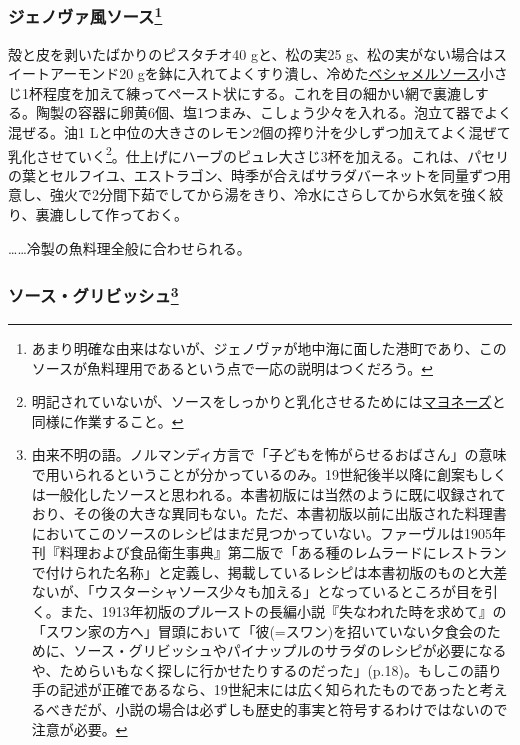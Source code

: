 \begin{recette}
\hypertarget{sauce-genoise-froids}{%
\subsubsection[ジェノヴァ風ソース]{\texorpdfstring{ジェノヴァ風ソース\footnote{あまり明確な由来はないが、ジェノヴァが地中海に面した港町であり、このソースが魚料理用であるという点で一応の説明はつくだろう。}}{ジェノヴァ風ソース}}\label{sauce-genoise-froids}}



殻と皮を剥いたばかりのピスタチオ40 gと、松の実25
g、松の実がない場合はスイートアーモンド20
gを鉢に入れてよくすり潰し、冷めた\protect\hyperlink{sauce-bechamel}{ベシャメルソース}小さじ1杯程度を加えて練ってペースト状にする。これを目の細かい網で裏漉しする。陶製の容器に卵黄6個、塩1つまみ、こしょう少々を入れる。泡立て器でよく混ぜる。油1
Lと中位の大きさのレモン2個の搾り汁を少しずつ加えてよく混ぜて乳化させていく\footnote{明記されていないが、ソースをしっかりと乳化させるためには\protect\hyperlink{mayonnaise}{マヨネーズ}と同様に作業すること。}。仕上げにハーブのピュレ大さじ3杯を加える。これは、パセリの葉とセルフイユ、エストラゴン、時季が合えばサラダバーネットを同量ずつ用意し、強火で2分間下茹でしてから湯をきり、冷水にさらしてから水気を強く絞り、裏漉しして作っておく。

\ldots{}\ldots{}冷製の魚料理全般に合わせられる。

\atoaki{}

\hypertarget{sauce-gribiche}{%
\subsubsection[ソース・グリビッシュ]{\texorpdfstring{ソース・グリビッシュ\footnote{由来不明の語。ノルマンディ方言で「子どもを怖がらせるおばさん」の意味で用いられるということが分かっているのみ。19世紀後半以降に創案もしくは一般化したソースと思われる。本書初版には当然のように既に収録されており、その後の大きな異同もない。ただ、本書初版以前に出版された料理書においてこのソースのレシピはまだ見つかっていない。ファーヴルは1905年刊『料理および食品衛生事典』第二版で「ある種のレムラードにレストランで付けられた名称」と定義し、掲載しているレシピは本書初版のものと大差ないが、「ウスターシャソース少々も加える」となっているところが目を引く。また、1913年初版のプルーストの長編小説『失なわれた時を求めて』の「スワン家の方へ」冒頭において「彼(=スワン)を招いていない夕食会のために、ソース・グリビッシュやパイナップルのサラダのレシピが必要になるや、ためらいもなく探しに行かせたりするのだった」(p.18)。もしこの語り手の記述が正確であるなら、19世紀末には広く知られたものであったと考えるべきだが、小説の場合は必ずしも歴史的事実と符号するわけではないので注意が必要。}}{ソース・グリビッシュ}}\label{sauce-gribiche}}


\end{recette}

